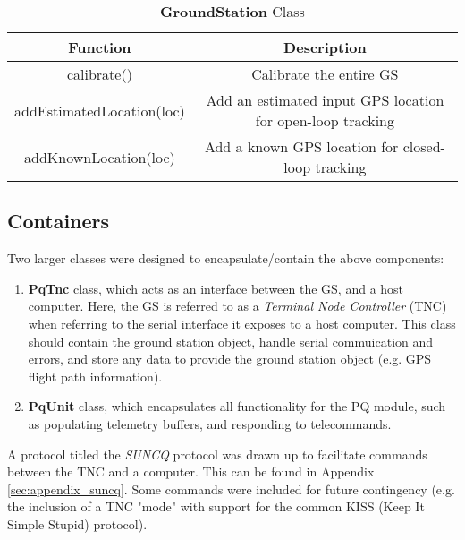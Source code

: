 \begin{table}[!htb]
  \centering
  \caption{\textbf{GroundStation} Class}
  \renewcommand{\arraystretch}{1.2}
  \begin{tabular}{ |c|c| }
  \hline
  \textbf{Function}             & \textbf{Description}    \\
  \hline
    calibrate()                 & Calibrate the entire GS \\
    addEstimatedLocation(loc)      & Add an estimated input GPS location for open-loop tracking \\
    addKnownLocation(loc)          & Add a known GPS location for closed-loop tracking \\
  \hline
  \end{tabular}
  \label{tab:groundStationUML}
\end{table}

\newpage

\subsection{Containers}
\noindent Two larger classes were designed to encapsulate/contain the above components:
\begin{enumerate}
  \item \textbf{PqTnc} class, which acts as an interface between the GS, and a host computer. Here, the GS is referred to as a \textit{Terminal Node Controller} (TNC) when referring to the serial interface it exposes to a host computer. This class should contain the ground station object, handle serial commuication and errors, and store any data to provide the ground station object (e.g. GPS flight path information).
  \item \textbf{PqUnit} class, which encapsulates all functionality for the PQ module, such as populating telemetry buffers, and responding to telecommands.
\end{enumerate}

\noindent A protocol titled the \textit{SUNCQ} protocol was drawn up to facilitate commands between the TNC and a computer. This can be found in Appendix \ref{sec:appendix_suncq}. Some commands were included for future contingency (e.g. the inclusion of a TNC "mode" with support for the common KISS (Keep It Simple Stupid) protocol).